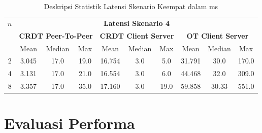 \begin{table}[H]
 \centering
 \caption{Deskripsi Statistik Latensi Skenario Keempat dalam ms}
\begin{tabular}{|c|ccccccccc|}
\hline
\multirow{3}{*}{\textbf{$n$}} & \multicolumn{9}{c|}{\textbf{Latensi Skenario 4}} \\ \cline{2-10}
 & \multicolumn{3}{c|}{\textbf{CRDT Peer-To-Peer}} & \multicolumn{3}{c|}{\textbf{CRDT Client Server}} & \multicolumn{3}{c|}{\textbf{OT Client Server}} \\ \cline{2-10}
 & \multicolumn{1}{c|}{Mean} & \multicolumn{1}{c|}{Median} & \multicolumn{1}{c|}{Max} & \multicolumn{1}{c|}{Mean} & \multicolumn{1}{c|}{Median} & \multicolumn{1}{c|}{Max} & \multicolumn{1}{c|}{Mean} & \multicolumn{1}{c|}{Median} & Max \\ \hline
2 & \multicolumn{1}{c|}{3.045} & \multicolumn{1}{c|}{17.0} & \multicolumn{1}{c|}{19.0} & \multicolumn{1}{c|}{16.754} & \multicolumn{1}{c|}{3.0} & \multicolumn{1}{c|}{5.0} & \multicolumn{1}{c|}{31.791} & \multicolumn{1}{c|}{30.0} & 170.0 \\ \hline
4 & \multicolumn{1}{c|}{3.131} & \multicolumn{1}{c|}{17.0} & \multicolumn{1}{c|}{21.0} & \multicolumn{1}{c|}{16.554} & \multicolumn{1}{c|}{3.0} & \multicolumn{1}{c|}{6.0} & \multicolumn{1}{c|}{44.468} & \multicolumn{1}{c|}{32.0} & 309.0 \\ \hline
8 & \multicolumn{1}{c|}{3.357} & \multicolumn{1}{c|}{17.0} & \multicolumn{1}{c|}{35.0} & \multicolumn{1}{c|}{17.160} & \multicolumn{1}{c|}{3.0} & \multicolumn{1}{c|}{19.0} & \multicolumn{1}{c|}{59.858} & \multicolumn{1}{c|}{30.33} & 551.0 \\ \hline
\end{tabular}
\end{table}

\section{Evaluasi Performa}
